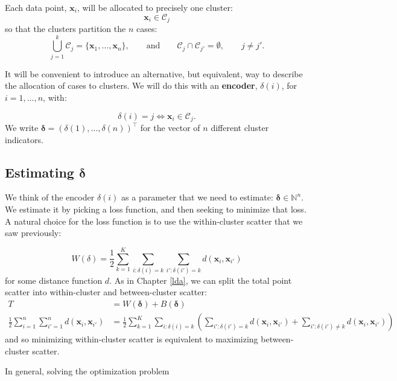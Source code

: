 \documentclass[
]{book}
\theoremstyle{definition}
\theoremstyle{definition}
\theoremstyle{definition}
\theoremstyle{definition}
\theoremstyle{remark}
\begin{document}
Each data point, \(\mathbf x_i\), will be allocated to precisely one cluster:
\[\mathbf x_i \in \mathcal{C}_j\]
so that the clusters partition the \(n\) cases:
\[
\bigcup_{j=1}^k \mathcal{C}_j = \{\mathbf x_1, \ldots , \mathbf x_n\}, \qquad \text{and} \qquad \mathcal{C}_j \cap \mathcal{C}_{j'} =\emptyset,\qquad j \neq j'.
\]

It will be convenient to introduce an alternative, but equivalent, way to describe the allocation of cases to clusters. We will do this with an \textbf{encoder}, \(\delta(i)\), for \(i=1, \ldots,n\), with:

\begin{equation}
\delta(i) = j \iff \mathbf x_i \in \mathcal{C}_j. 
\label{eq:two-way}
\end{equation}
We write \(\boldsymbol \delta=(\delta(1),\ldots , \delta(n))^\top\) for the vector of \(n\) different cluster indicators.

\hypertarget{estimating-boldsymbol-delta}{%
\subsection{\texorpdfstring{Estimating \(\boldsymbol \delta\)}{Estimating \textbackslash boldsymbol \textbackslash delta}}\label{estimating-boldsymbol-delta}}

We think of the encoder \(\delta(i)\) as a parameter that we need to estimate: \(\boldsymbol \delta\in \mathbb{N}^{n}\). We estimate it by picking a loss function, and then seeking to minimize that loss. A natural choice for the loss function is to use the within-cluster scatter that we saw previously:

\[W(\delta) = \frac{1}{2}\sum_{k=1}^K \sum_{i: \delta(i)=k} \sum_{i': \delta(i')=k} d(\mathbf x_i, \mathbf x_{i'})\]
for some distance function \(d\). As in Chapter \ref{lda}, we can split the total point scatter into within-cluster and between-cluster scatter:
\begin{align}
T&= W(\boldsymbol \delta)+B(\boldsymbol \delta)\\
\frac{1}{2}\sum_{i=1}^n \sum_{i'=1}^n d(\mathbf x_i, \mathbf x_{i'})&= \frac{1}{2}\sum_{k=1}^K \sum_{i: \delta(i)=k} \left(\sum_{i': \delta(i')=k} d(\mathbf x_i, \mathbf x_{i'})+\sum_{i': \delta(i')\not=k} d(\mathbf x_i, \mathbf x_{i'})\right)
\end{align}
and so minimizing within-cluster scatter is equivalent to maximizing between-cluster scatter.

In general, solving the optimization problem
\end{document}
